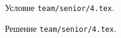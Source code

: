 \problem
Условие \texttt{team/senior/4.tex}.

\solution Решение \texttt{team/senior/4.tex}.
\endproblem
